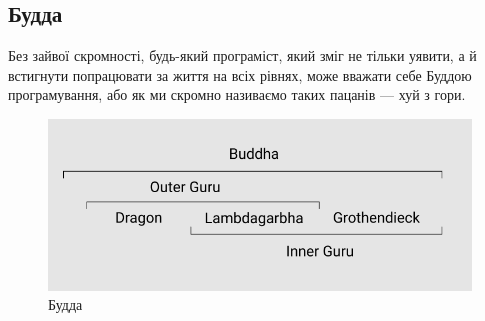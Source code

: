 \newpage
\subsection{Будда}

Без зайвої скромності, будь-який програміст, який зміг
не тільки уявити, а й встигнути попрацювати за життя
на всіх рівнях, може вважати себе Буддою програмування,
або як ми скромно називаємо таких пацанів — хуй з гори.

\begin{figure}[!htbp]
\centerline{\includegraphics[scale=0.46]{buddha.PNG}}
\caption{Будда}
\end{figure}

\normalsize
